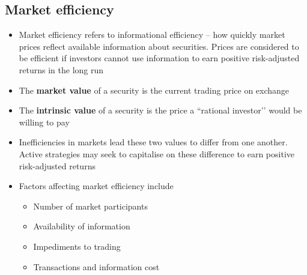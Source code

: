 \documentclass[../notes_compiled.tex]{subfiles}
\begin{document}
\subsection{Market efficiency}
\begin{itemize}
\item Market efficiency refers to informational efficiency -- how quickly market prices reflect available information about securities. Prices are considered to be efficient if investors cannot use information to earn positive risk-adjusted returns in the long run
\item The \textbf{market value} of a security is the current trading price on exchange
\item The \textbf{intrinsic value} of a security is the price a ``rational investor’’ would be willing to pay
\item Inefficiencies in markets lead these two values to differ from one another. Active strategies may seek to capitalise on these difference to earn positive risk-adjusted returns
\item Factors affecting market efficiency include
\begin{itemize}
\item Number of market participants
\item Availability of information
\item Impediments to trading
\item Transactions and information cost
\end{itemize}

\end{itemize}
\end{document}
